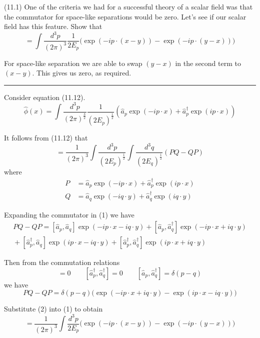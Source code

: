 \documentclass[12pt]{article}
\begin{document}
(11.1)
One of the criteria we had for a successful theory
of a scalar field was that the commutator for space-like
separations would be zero. Let's see if our scalar
field has this feature. Show that
\begin{equation*}
[\hat\phi(x),\hat\phi(y)]=\int
\frac{d^3p}{(2\pi)^3}\frac{1}{2E_p}
\big(
\exp(-ip\cdot(x-y))-\exp(-ip\cdot(y-x))
\big)
\tag{11.51}
\end{equation*}

For space-like separation we are able to swap $(y-x)$
in the second term to $(x-y)$. This gives us zero,
as required.

\bigskip
\hrule

\bigskip
Consider equation (11.12).
\begin{equation*}
\hat\phi(x)=\int\frac{d^3p}{(2\pi)^\frac{3}{2}}\frac{1}{(2E_p)^\frac{1}{2}}
\left(\hat a_p\exp(-ip\cdot x)+\hat a_p^\dag\exp(ip\cdot x)\right)
\tag{11.12}
\end{equation*}

It follows from (11.12) that
\begin{equation*}
[\hat\phi(x),\hat\phi(y)]=\frac{1}{(2\pi)^3}
\int\frac{d^3p}{(2E_p)^\frac{1}{2}}\int\frac{d^3q}{(2E_q)^\frac{1}{2}}(PQ-QP)
\tag{1}
\end{equation*}
where
\begin{align*}
P&=\hat a_p\exp(-ip\cdot x)+\hat a_p^\dag\exp(ip\cdot x)
\\
Q&=\hat a_q\exp(-iq\cdot y)+\hat a_q^\dag\exp(iq\cdot y)
\end{align*}

Expanding the commutator in (1) we have
\begin{multline*}
PQ-QP=
[\hat a_p,\hat a_q]\exp(-ip\cdot x-iq\cdot y)
+[\hat a_p,\hat a_q^\dag]\exp(-ip\cdot x+iq\cdot y)
\\
{}+[\hat a_p^\dag,\hat a_q]\exp(ip\cdot x-iq\cdot y)
+[\hat a_p^\dag,\hat a_q^\dag]\exp(ip\cdot x+iq\cdot y)
\end{multline*}

Then from the commutation relations
\begin{equation*}
[\hat a_p,\hat a_q]=0
\qquad
[\hat a_p^\dag,\hat a_q^\dag]=0
\qquad
[\hat a_p,\hat a_q^\dag]=\delta(p-q)
\end{equation*}
we have
\begin{equation*}
PQ-QP=\delta(p-q)\big(\exp(-ip\cdot x+iq\cdot y)-\exp(ip\cdot x-iq\cdot y)\big)
\tag{2}
\end{equation*}

Substitute (2) into (1) to obtain
\begin{equation*}
[\hat\phi(x),\hat\phi(y)]=\frac{1}{(2\pi)^3}
\int\frac{d^3p}{2E_p}\big(\exp(-ip\cdot(x-y))-\exp(-ip\cdot(y-x))\big)
\end{equation*}

\end{document}
